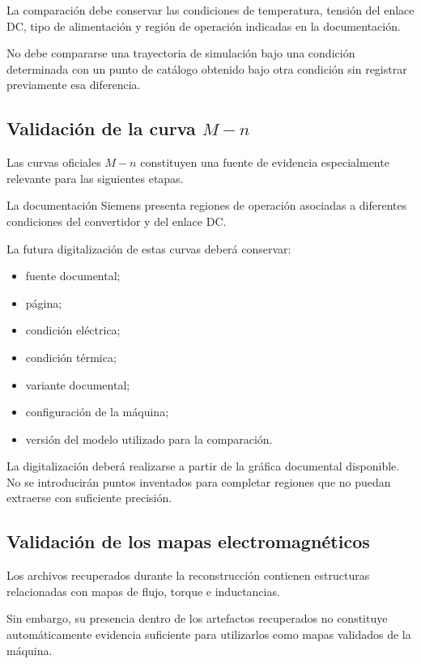 La comparación debe conservar las condiciones de temperatura, tensión del enlace DC, tipo de alimentación y región de operación indicadas en la documentación.

No debe compararse una trayectoria de simulación bajo una condición determinada con un punto de catálogo obtenido bajo otra condición sin registrar previamente esa diferencia.

\subsection{\texorpdfstring{Validación de la curva $M-n$}{Validación de la curva M-n}}

Las curvas oficiales $M-n$ constituyen una fuente de evidencia especialmente relevante para las siguientes etapas.

La documentación Siemens presenta regiones de operación asociadas a diferentes condiciones del convertidor y del enlace DC.

La futura digitalización de estas curvas deberá conservar:

\begin{itemize}
    \item fuente documental;
    \item página;
    \item condición eléctrica;
    \item condición térmica;
    \item variante documental;
    \item configuración de la máquina;
    \item versión del modelo utilizado para la comparación.
\end{itemize}

La digitalización deberá realizarse a partir de la gráfica documental disponible. No se introducirán puntos inventados para completar regiones que no puedan extraerse con suficiente precisión.

\subsection{Validación de los mapas electromagnéticos}

Los archivos recuperados durante la reconstrucción contienen estructuras relacionadas con mapas de flujo, torque e inductancias.

Sin embargo, su presencia dentro de los artefactos recuperados no constituye automáticamente evidencia suficiente para utilizarlos como mapas validados de la máquina.

